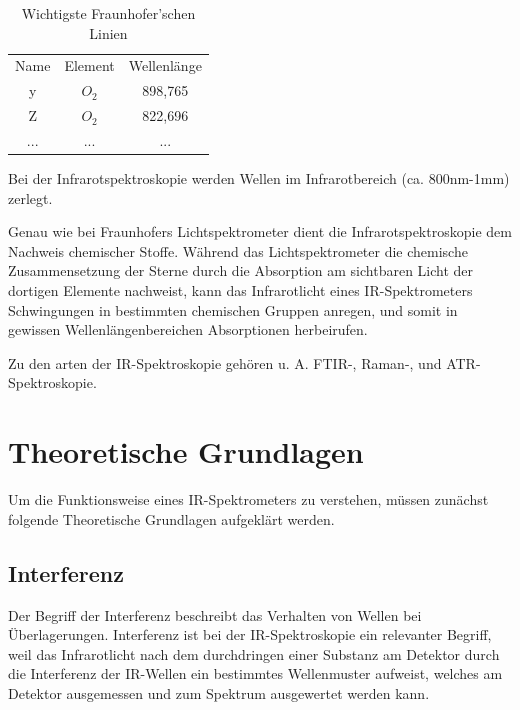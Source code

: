 \documentclass{article}
\begin{document}
\begin{table}
    \label{tab:wichtige-fraunhoferlinien}
    \begin{tabular}{|c|c|c|}
        \hline
        Name & Element & Wellenlänge \\
        y    & $O_2$    & 898,765    \\
        Z    & $O_2$    & 822,696    \\
        ...  & ...      & ...        \\ %
        \hline
    \end{tabular}
    \caption{Wichtigste Fraunhofer'schen Linien}
\end{table}

Bei der Infrarotspektroskopie werden Wellen im Infrarotbereich (ca. 800nm-1mm) zerlegt.

Genau wie bei Fraunhofers Lichtspektrometer dient die Infrarotspektroskopie dem Nachweis chemischer Stoffe. Während das Lichtspektrometer die chemische Zusammensetzung der Sterne durch die Absorption am sichtbaren Licht der dortigen Elemente nachweist, kann das Infrarotlicht eines IR-Spektrometers Schwingungen in bestimmten chemischen Gruppen anregen, und somit in gewissen Wellenlängenbereichen Absorptionen herbeirufen.

Zu den arten der IR-Spektroskopie gehören u. A. FTIR-, Raman-, und ATR-Spektroskopie.

\newpage
\section{Theoretische Grundlagen}

Um die Funktionsweise eines IR-Spektrometers zu verstehen, müssen zunächst folgende Theoretische Grundlagen aufgeklärt werden.

\subsection{Interferenz}

Der Begriff der Interferenz beschreibt das Verhalten von Wellen bei Überlagerungen.
Interferenz ist bei der IR-Spektroskopie ein relevanter Begriff, weil das Infrarotlicht nach dem durchdringen einer Substanz am Detektor durch die Interferenz der IR-Wellen ein bestimmtes Wellenmuster aufweist, welches am Detektor ausgemessen und zum Spektrum ausgewertet werden kann. 
\end{document}

